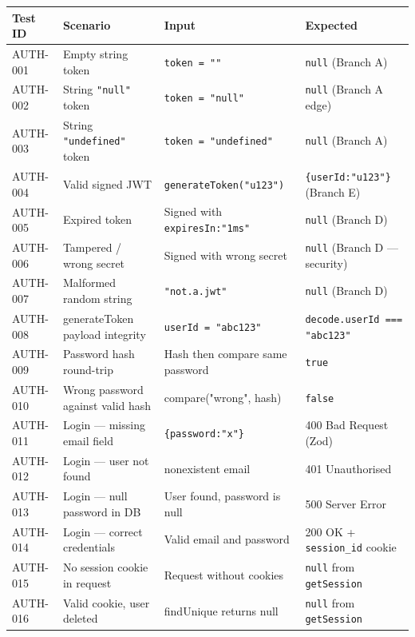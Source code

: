 \documentclass[12pt,a4paper]{report}
\begin{document}
\begin{longtable}{p{}p{}p{}p{}}
    \toprule
    \textbf{Test ID} & \textbf{Scenario} & \textbf{Input} & \textbf{Expected} \\
    \midrule
    \endhead
    AUTH-001 & Empty string token & \texttt{token = ""} & \texttt{null} (Branch A) \\
    AUTH-002 & String \texttt{"null"} token & \texttt{token = "null"} & \texttt{null} (Branch A edge) \\
    AUTH-003 & String \texttt{"undefined"} token & \texttt{token = "undefined"} & \texttt{null} (Branch A) \\
    AUTH-004 & Valid signed JWT & \texttt{generateToken("u123")} & \texttt{\{userId:"u123"\}} (Branch E) \\
    AUTH-005 & Expired token & Signed with \texttt{expiresIn:"1ms"} & \texttt{null} (Branch D) \\
    AUTH-006 & Tampered / wrong secret & Signed with wrong secret & \texttt{null} (Branch D --- security) \\
    AUTH-007 & Malformed random string & \texttt{"not.a.jwt"} & \texttt{null} (Branch D) \\
    AUTH-008 & generateToken payload integrity & \texttt{userId = "abc123"} & \texttt{decode.userId === "abc123"} \\
    AUTH-009 & Password hash round-trip & Hash then compare same password & \texttt{true} \\
    AUTH-010 & Wrong password against valid hash & compare("wrong", hash) & \texttt{false} \\
    AUTH-011 & Login --- missing email field & \texttt{\{password:"x"\}} & 400 Bad Request (Zod) \\
    AUTH-012 & Login --- user not found & nonexistent email & 401 Unauthorised \\
    AUTH-013 & Login --- null password in DB & User found, password is null & 500 Server Error \\
    AUTH-014 & Login --- correct credentials & Valid email and password & 200 OK + \texttt{session\_id} cookie \\
    AUTH-015 & No session cookie in request & Request without cookies & \texttt{null} from \texttt{getSession} \\
    AUTH-016 & Valid cookie, user deleted & findUnique returns null & \texttt{null} from \texttt{getSession} \\
    \bottomrule
\end{longtable}
\end{document}
